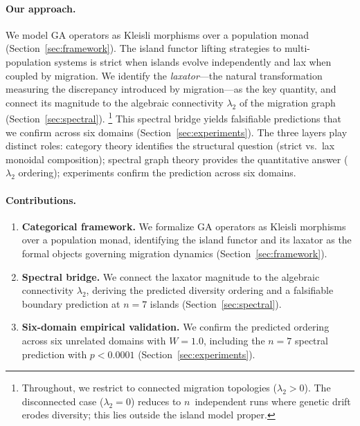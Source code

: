 \documentclass[submission,copyright,creativecommons]{eptcs}
\begin{document}
\paragraph{Our approach.}
We model GA operators as Kleisli morphisms over a population monad
(Section~\ref{sec:framework}). The island functor lifting strategies
to multi-population systems is strict when islands evolve
independently and lax when coupled by migration. We identify the
\emph{laxator}---the natural transformation measuring the discrepancy
introduced by migration---as the key quantity, and connect its
magnitude to the algebraic connectivity $\lambda_2$ of the migration
graph (Section~\ref{sec:spectral}).%
\footnote{Throughout, we restrict to connected migration topologies ($\lambda_2 > 0$). The disconnected case ($\lambda_2 = 0$) reduces to $n$~independent runs where genetic drift erodes diversity; this lies outside the island model proper.}
This spectral bridge yields falsifiable predictions that we confirm
across six domains (Section~\ref{sec:experiments}).
The three layers play distinct roles: category theory identifies the
structural question (strict vs.\ lax monoidal composition); spectral
graph theory provides the quantitative answer ($\lambda_2$ ordering);
experiments confirm the prediction across six domains.

\paragraph{Contributions.}
\begin{enumerate}
\item \textbf{Categorical framework.} We formalize GA operators as
  Kleisli morphisms over a population monad, identifying the island
  functor and its laxator as the formal objects governing migration
  dynamics (Section~\ref{sec:framework}).
\item \textbf{Spectral bridge.} We connect the laxator magnitude to
  the algebraic connectivity $\lambda_2$, deriving the predicted
  diversity ordering and a falsifiable boundary prediction at
  $n{=}7$ islands (Section~\ref{sec:spectral}).
\item \textbf{Six-domain empirical validation.} We confirm the
  predicted ordering across six unrelated domains with $W = 1.0$,
  including the $n{=}7$ spectral prediction with $p < 0.0001$
  (Section~\ref{sec:experiments}).
\end{enumerate}

\end{document}
